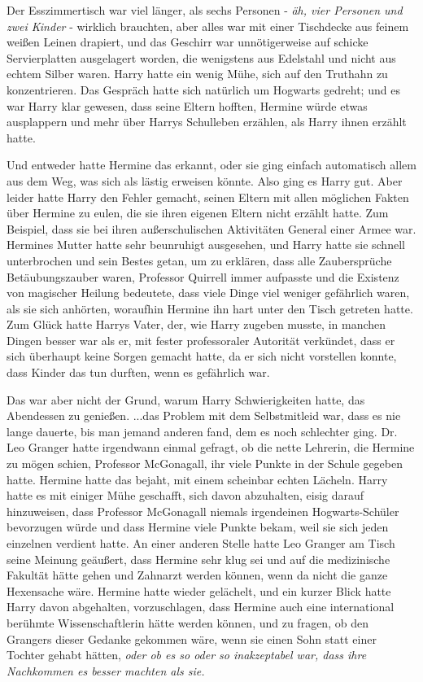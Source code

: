 Der Esszimmertisch war viel länger, als sechs Personen -\emph{ äh, vier Personen
und zwei Kinder} - wirklich brauchten, aber alles war mit einer Tischdecke aus
feinem weißen Leinen drapiert, und das Geschirr war unnötigerweise auf schicke
Servierplatten ausgelagert worden, die wenigstens aus Edelstahl und nicht aus
echtem Silber waren. Harry hatte ein wenig Mühe, sich auf den Truthahn zu
konzentrieren. Das Gespräch hatte sich natürlich um Hogwarts gedreht; und es war
Harry klar gewesen, dass seine Eltern hofften, Hermine würde etwas ausplappern
und mehr über Harrys Schulleben erzählen, als Harry ihnen erzählt hatte.

Und entweder hatte Hermine das erkannt, oder sie ging einfach automatisch allem
aus dem Weg, was sich als lästig erweisen könnte. Also ging es Harry gut. Aber
leider hatte Harry den Fehler gemacht, seinen Eltern mit allen möglichen Fakten
über Hermine zu eulen, die sie ihren eigenen Eltern nicht erzählt hatte. Zum
Beispiel, dass sie bei ihren außerschulischen Aktivitäten General einer Armee
war. Hermines Mutter hatte sehr beunruhigt ausgesehen, und Harry hatte sie
schnell unterbrochen und sein Bestes getan, um zu erklären, dass alle
Zaubersprüche Betäubungszauber waren, Professor Quirrell immer aufpasste und die
Existenz von magischer Heilung bedeutete, dass viele Dinge viel weniger
gefährlich waren, als sie sich anhörten, woraufhin Hermine ihn hart unter den
Tisch getreten hatte. Zum Glück hatte Harrys Vater, der, wie Harry zugeben
musste, in manchen Dingen besser war als er, mit fester professoraler Autorität
verkündet, dass er sich überhaupt keine Sorgen gemacht hatte, da er sich nicht
vorstellen konnte, dass Kinder das tun durften, wenn es gefährlich war.

Das war aber nicht der Grund, warum Harry Schwierigkeiten hatte, das Abendessen
zu genießen. ...das Problem mit dem Selbstmitleid war, dass es nie lange
dauerte, bis man jemand anderen fand, dem es noch schlechter ging. Dr. Leo
Granger hatte irgendwann einmal gefragt, ob die nette Lehrerin, die Hermine zu
mögen schien, Professor McGonagall, ihr viele Punkte in der Schule gegeben
hatte. Hermine hatte das bejaht, mit einem scheinbar echten Lächeln. Harry hatte
es mit einiger Mühe geschafft, sich davon abzuhalten, eisig darauf hinzuweisen,
dass Professor McGonagall niemals irgendeinen Hogwarts-Schüler bevorzugen würde
und dass Hermine viele Punkte bekam, weil sie sich jeden einzelnen verdient
hatte. An einer anderen Stelle hatte Leo Granger am Tisch seine Meinung
geäußert, dass Hermine sehr klug sei und auf die medizinische Fakultät hätte
gehen und Zahnarzt werden können, wenn da nicht die ganze Hexensache wäre.
Hermine hatte wieder gelächelt, und ein kurzer Blick hatte Harry davon
abgehalten, vorzuschlagen, dass Hermine auch eine international berühmte
Wissenschaftlerin hätte werden können, und zu fragen, ob den Grangers dieser
Gedanke gekommen wäre, wenn sie einen Sohn statt einer Tochter gehabt hätten,
\emph{oder ob es so oder so inakzeptabel war, dass ihre Nachkommen es besser
machten als sie.}

